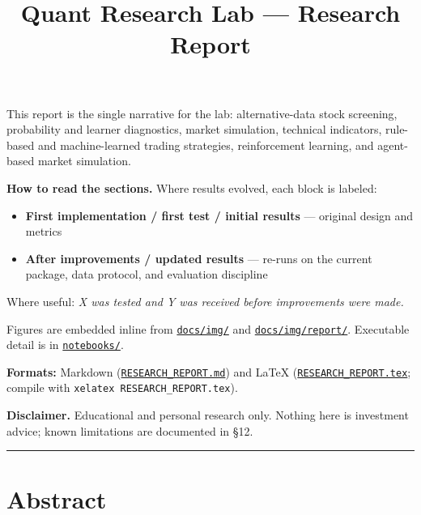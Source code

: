 \documentclass[
  11pt,
]{article}
\title{Quant Research Lab --- Research Report}
\author{}
\date{}
\providecommand{\tightlist}{%
  \setlength{\itemsep}{0pt}\setlength{\parskip}{0pt}}
\begin{document}
\maketitle

This report is the single narrative for the lab: alternative-data stock
screening, probability and learner diagnostics, market simulation,
technical indicators, rule-based and machine-learned trading strategies,
reinforcement learning, and agent-based market simulation.

\textbf{How to read the sections.} Where results evolved, each block is
labeled:

\begin{itemize}
\tightlist
\item
  \textbf{First implementation / first test / initial results} ---
  original design and metrics
\item
  \textbf{After improvements / updated results} --- re-runs on the
  current package, data protocol, and evaluation discipline
\end{itemize}

Where useful: \emph{X was tested and Y was received before improvements
were made.}

Figures are embedded inline from \href{img/}{\texttt{docs/img/}} and
\href{img/report/}{\texttt{docs/img/report/}}. Executable detail is in
\href{../notebooks/}{\texttt{notebooks/}}.

\textbf{Formats:} Markdown
(\href{RESEARCH_REPORT.md}{\texttt{RESEARCH\_REPORT.md}}) and LaTeX
(\href{RESEARCH_REPORT.tex}{\texttt{RESEARCH\_REPORT.tex}}; compile with
\texttt{xelatex\ RESEARCH\_REPORT.tex}).

\textbf{Disclaimer.} Educational and personal research only. Nothing
here is investment advice; known limitations are documented in §12.

\begin{center}\rule{0.5\linewidth}{0.5pt}\end{center}

\section{Abstract}\label{abstract}
\end{document}
